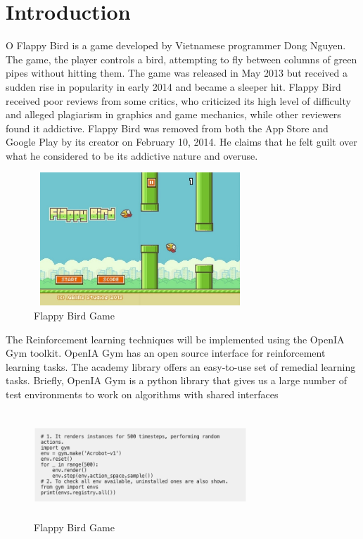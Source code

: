 
\section{Introduction}

  O Flappy Bird is a game developed by Vietnamese programmer Dong Nguyen. The game, the player controls a bird, attempting to fly between columns of green pipes without hitting them. 
  The game was released in May 2013 but received a sudden rise in popularity in early 2014 and became a sleeper hit. Flappy Bird received poor reviews from some critics, who criticized its high level of difficulty and alleged plagiarism in graphics and game mechanics, while other reviewers found it addictive. 
  Flappy Bird was removed from both the App Store and Google Play by its creator on February 10, 2014. He claims that he felt guilt over what he considered to be its addictive nature and overuse.

  \begin{figure}[H]
  \includegraphics[width=8cm, height=5cm]{figuras/flappy-bird.jpeg}
  \caption{Flappy Bird Game}
  \end{figure} 
  
 
  The Reinforcement learning techniques will be implemented using the OpenIA Gym toolkit. OpenIA Gym has an open source interface for reinforcement learning tasks.
  The academy library offers an easy-to-use set of remedial learning tasks.
  Briefly, OpenIA Gym is a python library that gives us a large number of test environments to work on algorithms with shared interfaces
  
  \begin{figure}[H]
  \includegraphics[width=8cm, height=4cm]{figuras/openIA_code_example.png}
  \caption{Flappy Bird Game}
  \end{figure} 
